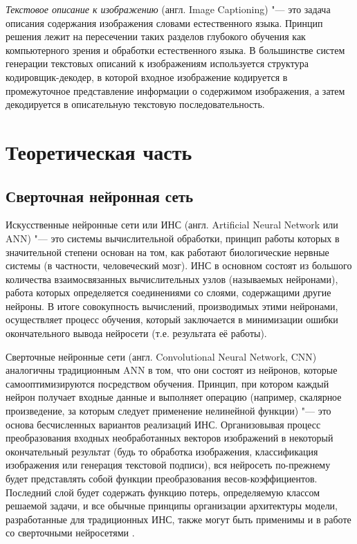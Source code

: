 \documentclass[bachelor, och, coursework]{SCWorks}
\begin{document}
    \textit{Текстовое описание к изображению} (англ. Image Captioning) "--- это
    задача описания содержания изображения словами естественного языка. Принцип
    решения лежит на пересечении таких разделов глубокого обучения как
    компьютерного зрения и обработки естественного языка. В большинстве систем
    генерации текстовых описаний к изображениям используется структура
    кодировщик-декодер, в которой входное изображение кодируется в промежуточное
    представление информации о содержимом изображения, а затем декодируется в
    описательную текстовую последовательность.

\section{Теоретическая часть}

    \subsection{Сверточная нейронная сеть}

        Искусственные нейронные сети или ИНС (англ. Artificial Neural Network
        или ANN) "--- это системы вычислительной обработки, принцип работы
        которых в значительной степени основан на том, как работают
        биологические нервные системы (в частности, человеческий мозг). ИНС в
        основном состоят из большого количества взаимосвязанных вычислительных
        узлов (называемых нейронами), работа которых определяется соединениями
        со слоями, содержащими другие нейроны. В итоге совокупность вычислений,
        производимых этими нейронами, осуществляет процесс обучения, который
        заключается в минимизации ошибки окончательного вывода нейросети (т.е.
        результата её работы).
        
        Сверточные нейронные сети (англ. Convolutional Neural Network, CNN)
        аналогичны традиционным ANN в том, что они состоят из нейронов, которые
        самооптимизируются посредством обучения. Принцип, при котором каждый
        нейрон получает входные данные и выполняет операцию (например, скалярное
        произведение, за которым следует применение нелинейной функции) "--- это
        основа бесчисленных вариантов реализаций ИНС. Организовывая процесс
        преобразования входных необработанных векторов изображений в некоторый
        окончательный результат (будь то обработка изображения, классификация
        изображения или генерация текстовой подписи), вся нейросеть по-прежнему
        будет представлять собой функции преобразования весов-коэффициентов.
        Последний слой будет содержать функцию потерь, определяемую классом
        решаемой задачи, и все обычные принципы организации архитектуры модели,
        разработанные для традиционных ИНС, также могут быть применимы и в
        работе со сверточными нейросетями \cite{cnn1}. 
\end{document}
